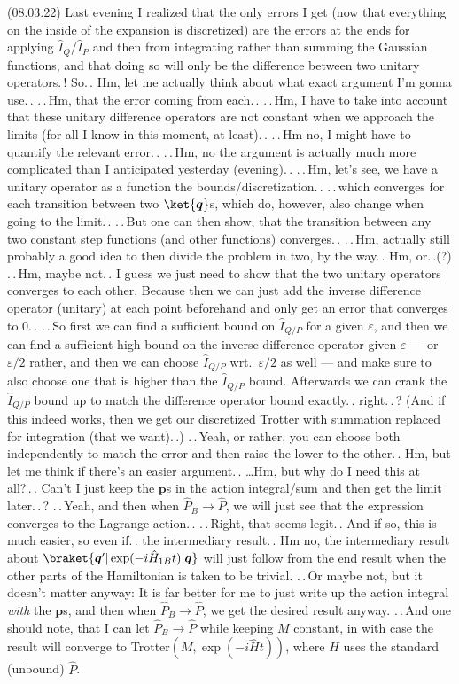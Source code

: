 \documentclass{report}
\begin{document}
(08.03.22) Last evening I realized that the only errors I get (now that everything on the inside of the expansion is discretized) are the errors at the ends for applying $\hat I_Q$/$\hat I_P$ and then from integrating rather than summing the Gaussian functions, and that doing so will only be the difference between two unitary operators.\,! So.\,. Hm, let me actually think about what exact argument I'm gonna use.\,. .\,.\,Hm, that the error coming from each.\,. .\,.\,Hm, I have to take into account that these unitary difference operators are not constant when we approach the limits (for all I know in this moment, at least).\,. .\,.\,Hm no, I might have to quantify the relevant error.\,. .\,.\,Hm, no the argument is actually much more complicated than I anticipated yesterday (evening).\,. .\,.\,Hm, let's see, we have a unitary operator as a function the bounds/discretization.\,. .\,.\,which converges for each transition between two $\ket{\boldsymbol{q}}$s, which do, however, also change when going to the limit.\,. .\,.\,But one can then show, that the transition between any two constant step functions (and other functions) converges.\,. .\,.\,Hm, actually still probably a good idea to then divide the problem in two, by the way.\,. Hm, or.\,.(?) .\,.\,Hm, maybe not.\,. I guess we just need to show that the two unitary operators converges to each other. Because then we can just add the inverse difference operator (unitary) at each point beforehand and only get an error that converges to 0.\,. .\,.\,So first we can find a sufficient bound on $\hat I_{Q/P}$ for a given $\varepsilon$, and then we can find a sufficient high bound on the inverse difference operator given $\varepsilon$ --- or $\varepsilon/2$ rather, and then we can choose $\hat I_{Q/P}$ wrt.\ $\varepsilon/2$ as well --- and make sure to also choose one that is higher than the $\hat I_{Q/P}$ bound. Afterwards we can crank the $\hat I_{Q/P}$ bound up to match the difference operator bound exactly.\,. right.\,.\,? (And if this indeed works, then we get our discretized Trotter with summation replaced for integration (that we want).\,.) .\,.\,Yeah, or rather, you can choose both independently to match the error and then raise the lower to the other.\,. Hm, but let me think if there's an easier argument.\,. \ldots Hm, but why do I need this at all?\,.\,. Can't I just keep the $\boldsymbol{p}$s in the action integral/sum and then get the limit later.\,.\,? .\,.\,Yeah, and then when $\hat P_B \to \hat P$, we will just see that the expression converges to the Lagrange action.\,. .\,.\,Right, that seems legit.\,. And if so, this is much easier, so even if.\,. the intermediary result.\,. Hm no, the intermediary result about $\braket{\boldsymbol{q}' | \exp(-i \hat H_{1B} t) | \boldsymbol{q}}$ will just follow from the end result when the other parts of the Hamiltonian is taken to be trivial. .\,.\,Or maybe not, but it doesn't matter anyway: It is far better for me to just write up the action integral \emph{with} the $\boldsymbol{p}$s, and then when $\hat P_B \to \hat P$, we get the desired result anyway. .\,.\,And one should note, that I can let $\hat P_B \to \hat P$ while keeping $M$ constant, in with case the result will converge to Trotter$(M, \exp(-i\hat H t))$, where $\hat H$ uses the standard (unbound) $\hat P$. 
\end{document}
